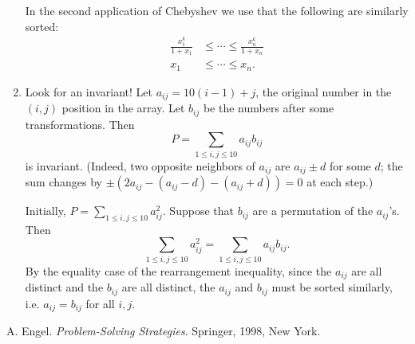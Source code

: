 \begin{enumerate}
In the second application of Chebyshev we use that the following are similarly sorted:
\begin{align*}
\frac{x_1^k}{1+x_1}&\le\cdots \le \frac{x_n^k}{1+x_n}\\
x_1&\le \cdots \le x_n.
\end{align*}
\item
Look for an invariant! Let $a_{ij}=10(i-1)+j$, the original number in the $(i,j)$ position in the array. Let $b_{ij}$ be the numbers after some transformations. Then
\[P=\sum_{1\leq i,j \leq 10} a_{ij}b_{ij}\]
is invariant. 
(Indeed, two opposite neighbors of $a_{ij}$ are $a_{ij}\pm d$ 
for some $d$; 
the sum changes by $\pm(2a_{ij}-(a_{ij}-d)-(a_{ij}+d))=0$ 
at each step.)

Initially, $P=\sum_{1\leq i,j \leq 10} a_{ij}^2$. Suppose that $b_{ij}$ are a permutation of the $a_{ij}$'s. Then
\[\sum_{1\leq i,j \leq 10} a_{ij}^2=\sum_{1\leq i,j \leq 10} a_{ij}b_{ij}.\]
By the equality case of the rearrangement inequality, since the $a_{ij}$ are all distinct and the $b_{ij}$ are all distinct, the $a_{ij}$ and $b_{ij}$ must be sorted similarly, i.e. $a_{ij}=b_{ij}$ for all $i,j$.
\end{enumerate}
\begin{thebibliography}{9}
 A. Engel. {\it Problem-Solving Strategies}. Springer, 1998, New York.
\end{thebibliography}
